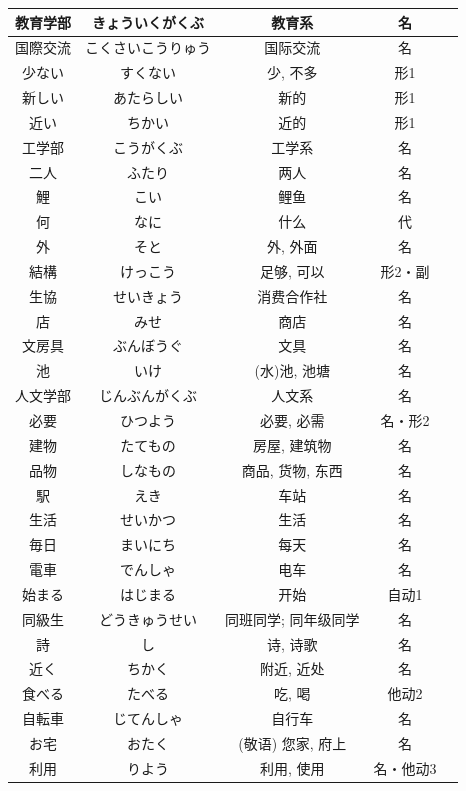 \begin{longtable}{|c|c|c|c|c|}
教育学部 & きょういくがくぶ & 教育系 & 名 &  \\ \hline
国際交流 & こくさいこうりゅう & 国际交流 & 名 &  \\ \hline
少ない & すくない & 少, 不多 & 形1 &  \\ \hline
新しい & あたらしい & 新的 & 形1 &  \\ \hline
近い & ちかい & 近的 & 形1 &  \\ \hline
工学部 & こうがくぶ & 工学系 & 名 &  \\ \hline
二人 & ふたり & 两人 & 名 &  \\ \hline
鯉 & こい & 鲤鱼 & 名 &  \\ \hline
何 & なに & 什么 & 代 &  \\ \hline
外 & そと & 外, 外面 & 名 &  \\ \hline
結構 & けっこう & 足够, 可以 & 形2・副 &  \\ \hline
生協 & せいきょう & 消费合作社 & 名 &  \\ \hline
店 & みせ & 商店 & 名 &  \\ \hline
文房具 & ぶんぼうぐ & 文具 & 名 &  \\ \hline
池 & いけ & (水)池, 池塘 & 名 &  \\ \hline
人文学部 & じんぶんがくぶ & 人文系 & 名 &  \\ \hline
必要 & ひつよう & 必要, 必需 & 名・形2 &  \\ \hline
建物 & たてもの & 房屋, 建筑物 & 名 &  \\ \hline
品物 & しなもの & 商品, 货物, 东西 & 名 &  \\ \hline
駅 & えき & 车站 & 名 &  \\ \hline
生活 & せいかつ & 生活 & 名 &  \\ \hline
毎日 & まいにち & 每天 & 名 &  \\ \hline
電車 & でんしゃ & 电车 & 名 &  \\ \hline
始まる & はじまる & 开始 & 自动1 &  \\ \hline
同級生 & どうきゅうせい & 同班同学; 同年级同学 & 名 &  \\ \hline
詩 & し & 诗, 诗歌 & 名 &  \\ \hline
近く & ちかく & 附近, 近处 & 名 &  \\ \hline
食べる & たべる & 吃, 喝 & 他动2 &  \\ \hline
自転車 & じてんしゃ & 自行车 & 名 &  \\ \hline
お宅 & おたく & (敬语) 您家, 府上 & 名 &  \\ \hline
利用 & りよう & 利用, 使用 & 名・他动3 &  \\ \hline

\end{longtable}
